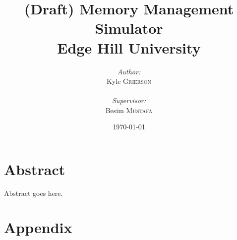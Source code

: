\documentclass[11pt, twoside]{report}
\title{
	{(Draft) Memory Management Simulator}\\
	{\large Edge Hill University}
}
\author{
	\begin{minipage}{0.4\textwidth}
		\begin{flushleft} \large
			\emph{Author:}\\
			Kyle \textsc{Grierson}\\
		\end{flushleft}	
	\end{minipage}
	\begin{minipage}{0.4\textwidth}
		\begin{flushright} \large
			\emph{Supervisor:} \\
			Besim \textsc{Mustafa}
		\end{flushright}
	\end{minipage}
}
\date{\today}
\begin{document}
\maketitle

\chapter*{Abstract}
Abstract goes here. \cite{tanenbaum2007modern}

\tableofcontents





\appendix
\chapter{Appendix}
%



\end{document}
